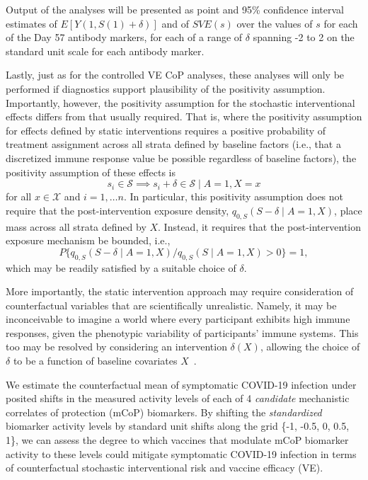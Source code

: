 Output of the analyses will be presented as point and 95\% confidence interval
estimates of $E[Y(1, S(1) + \delta)]$ and of $SVE(s)$ over the values of $s$ for
each of the Day 57 antibody markers, for each of a range of $\delta$ spanning -2
to 2 on the standard unit scale for each antibody marker.

Lastly, just as for the controlled VE CoP analyses, these analyses will only be
performed if diagnostics support plausibility of the positivity assumption.
Importantly, however, the positivity assumption for the stochastic
interventional effects differs from that usually required. That is, where the
positivity assumption for effects defined by static interventions requires
a positive probability of treatment assignment across all strata defined by
baseline factors (i.e., that a discretized immune response value be possible
regardless of baseline factors), the positivity assumption of these effects is
$$s_i \in \mathcal{S} \implies s_i + \delta
    \in \mathcal{S} \mid A = 1, X = x$$
\noindent for all $x \in \mathcal{X}$ and
    $i = 1, \ldots n$.
In particular, this positivity assumption does not require that the
post-intervention exposure density, $q_{0,S}(S - \delta \mid A = 1, X)$,  place
mass across all strata defined by $X$. Instead, it requires that the
post-intervention exposure mechanism be bounded, i.e.,
$$P
\{q_{0,S}(S - \delta \mid A = 1, X) / q_{0,S}(S \mid A = 1, X) > 0 \} = 1,$$
\noindent which may be readily satisfied by a suitable choice of $\delta$.

More importantly, the static intervention approach may require consideration of
counterfactual variables that are scientifically unrealistic. Namely, it may be
inconceivable to imagine a world where every participant exhibits high immune
responses, given the phenotypic variability of participants' immune systems.
This too may be resolved by considering an intervention $\delta(X)$, allowing
the choice of $\delta$ to be a function of baseline covariates
$X$~\citep{hejazi2020efficient, diaz2012population, haneuse2013estimation,
diaz2018stochastic}.

We estimate the counterfactual mean of symptomatic COVID-19 infection
under posited shifts in the measured activity levels of each of 4
\emph{candidate} mechanistic correlates of protection (mCoP) biomarkers.
By shifting the \emph{standardized} biomarker activity levels by
standard unit shifts along the grid \{-1, -0.5, 0, 0.5, 1\}, we can
assess the degree to which vaccines that modulate mCoP biomarker
activity to these levels could mitigate symptomatic COVID-19 infection
in terms of counterfactual stochastic interventional risk and vaccine
efficacy (VE).

